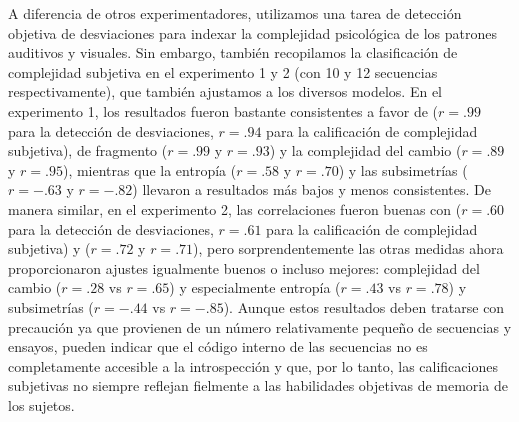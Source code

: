 
A diferencia de otros experimentadores, utilizamos una tarea de detección objetiva de desviaciones para indexar la complejidad psicológica de los patrones auditivos y visuales. Sin embargo, también recopilamos la clasificación de complejidad subjetiva en el experimento 1 y 2 (con 10 y 12 secuencias respectivamente), que también ajustamos a los diversos modelos. En el experimento 1, los resultados fueron bastante consistentes a favor de \mdlbin ($r = .99$ para la detección de desviaciones, $r = .94$ para la calificación de complejidad subjetiva), \mdlbin de fragmento ($r = .99$ y $r = .93$) y la complejidad del cambio ($r = .89$ y $r = .95$), mientras que la entropía ($r = .58$ y $r = .70$) y las subsimetrías ($r = -.63$ y $r = -.82$) llevaron a resultados más bajos y menos consistentes. De manera similar, en el experimento 2, las correlaciones fueron buenas con \mdlbin ($r = .60$ para la detección de desviaciones, $r = .61$ para la calificación de complejidad subjetiva) y \mdlbinfrag ($r = .72$ y $r = .71$), pero sorprendentemente las otras medidas ahora proporcionaron ajustes igualmente buenos o incluso mejores: complejidad del cambio ($r = .28$ vs $r = .65$) y especialmente entropía ($r = .43$ vs $r = .78$) y subsimetrías ($r = -. 44$ vs $r = -. 85$). Aunque estos resultados deben tratarse con precaución ya que provienen de un número relativamente pequeño de secuencias y ensayos, pueden indicar que el código interno de las secuencias no es completamente accesible a la introspección y que, por lo tanto, las calificaciones subjetivas no siempre reflejan fielmente a las habilidades objetivas de memoria de los sujetos.



